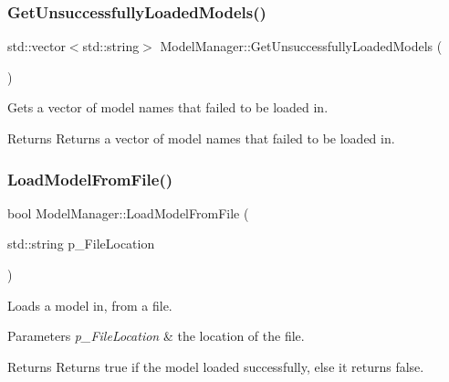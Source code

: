 \subsubsection{\texorpdfstring{GetUnsuccessfullyLoadedModels()}{GetUnsuccessfullyLoadedModels()}}
{\footnotesize\ttfamily std\+::vector$<$std\+::string$>$ Model\+Manager\+::\+Get\+Unsuccessfully\+Loaded\+Models (\begin{DoxyParamCaption}{ }\end{DoxyParamCaption})\hspace{0.3cm}{\ttfamily [inline]}}



Gets a vector of model name\textquotesingle{}s that failed to be loaded in. 

\begin{DoxyReturn}{Returns}
Returns a vector of model name\textquotesingle{}s that failed to be loaded in. 
\end{DoxyReturn}
\mbox{\label{class_model_manager_abda1bb8020099cec8f025d76e022c42c}} 
\subsubsection{\texorpdfstring{LoadModelFromFile()}{LoadModelFromFile()}\hspace{0.1cm}{\footnotesize\ttfamily [1/2]}}
{\footnotesize\ttfamily bool Model\+Manager\+::\+Load\+Model\+From\+File (\begin{DoxyParamCaption}\item[{std\+::string}]{p\+\_\+\+File\+Location }\end{DoxyParamCaption})\hspace{0.3cm}{\ttfamily [inline]}}



Loads a model in, from a file. 


\begin{DoxyParams}{Parameters}
{\em p\+\_\+\+File\+Location} & the location of the file. \\
\hline
\end{DoxyParams}
\begin{DoxyReturn}{Returns}
Returns true if the model loaded successfully, else it returns false. 
\end{DoxyReturn}
\mbox{\label{class_model_manager_a571ee1560b3d25da728c9904ddd37bcc}} 
